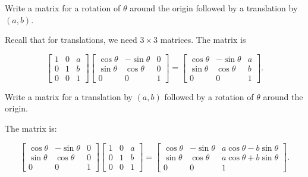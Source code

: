 \documentclass[../gatm_answers.tex]{subfiles}
\begin{document}
\begin{outer_problem}
\item 
\end{outer_problem}

\begin{inner_problem}[start=1]
\item Write a matrix for a rotation of $\theta$ around the origin followed by a translation by $(a,b)$.
\end{inner_problem}

Recall that for translations, we need $3\times 3$ matrices. The matrix is

$$\begin{bmatrix}1 & 0 & a \\ 0 & 1 & b \\ 0 & 0 & 1 \end{bmatrix} \begin{bmatrix} \cos\theta & -\sin\theta & 0 \\ \sin\theta & \cos\theta & 0 \\ 0 & 0 & 1 \end{bmatrix} = \begin{bmatrix} \cos\theta & -\sin\theta & a \\ \sin\theta & \cos\theta & b \\ 0 & 0 & 1 \end{bmatrix}.$$

\begin{inner_problem}
\item Write a matrix for a translation by $(a,b)$ followed by a rotation of $\theta$ around the origin.
\end{inner_problem}

The matrix is:

$$\begin{bmatrix} \cos\theta & -\sin\theta & 0 \\ \sin\theta & \cos\theta & 0 \\ 0 & 0 & 1 \end{bmatrix} \begin{bmatrix}1 & 0 & a \\ 0 & 1 & b \\ 0 & 0 & 1 \end{bmatrix} = \begin{bmatrix} \cos\theta & -\sin\theta & a\cos\theta - b\sin\theta \\ \sin\theta & \cos\theta & a\cos\theta + b\sin\theta \\ 0 & 0 & 1 \end{bmatrix}.$$
\end{document}

